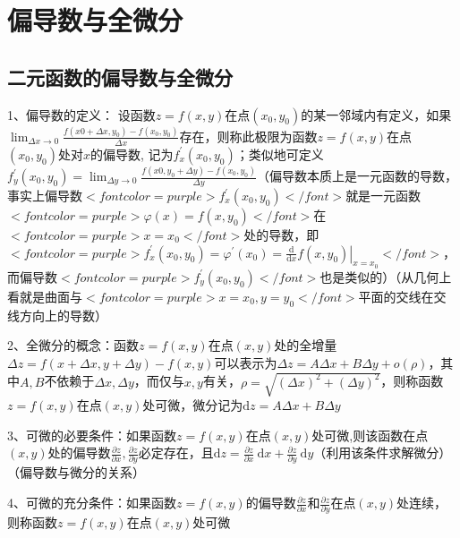 \section{偏导数与全微分}



\subsection{二元函数的偏导数与全微分}

1、偏导数的定义： 设函数$ z=f(x, y) $在点$ \left(x_{0}, y_{0}\right) $的某一邻域内有定义，如果$ \lim_{\Delta x \rightarrow 0} \frac{f\left(x{0}+\Delta x, y_{0}\right)-f\left(x_{0}, y_{0}\right)}{\Delta x} $存在，则称此极限为函数$ z=f(x, y) $在点$ \left(x_{0}, y_{0}\right) $处对$ x $的偏导数, 记为$ f_{x}^{\prime}\left(x_{0}, y_{0}\right) $；类似地可定义$ f_{y}^{\prime}\left(x_{0}, y_{0}\right)=\lim_{\Delta y \rightarrow 0} \frac{f\left(x{0}, y_{0}+\Delta y\right)-f\left(x_{0}, y_{0}\right)}{\Delta y} $（偏导数本质上是一元函数的导数，事实上偏导数$ <font color=purple>f_{x}^{\prime}\left(x_{0}, y_{0}\right)</font> $就是一元函数$ <font color=purple>\varphi(x)=f\left(x, y_{0}\right)</font> $在$ <font color=purple>x=x_{0}</font> $处的导数，即$ <font color=purple>f_{x}^{\prime}\left(x_{0}, y_{0}\right)=\varphi^{\prime}\left(x_{0}\right)=\left.\frac{\mathrm{d}}{\mathrm{d} x} f\left(x, y_{0}\right)\right|_{x=x_{0}}</font> $，而偏导数$ <font color=purple>f_{y}^{\prime}\left(x_{0}, y_{0}\right)</font> $也是类似的）（从几何上看就是曲面与$ <font color=purple>x=x_0,y=y_0</font> $平面的交线在交线方向上的导数）

2、全微分的概念：函数$ z=f(x, y) $在点$ (x, y) $处的全增量$ \Delta z=f(x+\Delta x, y+\Delta y)-f(x, y) $可以表示为$ \Delta z=A \Delta x+B \Delta y+o(\rho) $，其中$ A,B $不依赖于$ \Delta x, \Delta y $，而仅与$ x, y $有关，$ \rho=\sqrt{(\Delta x)^{2}+(\Delta y)^{2}} $，则称函数$ z=f(x, y) $在点$ (x, y) $处可微，微分记为$ \mathrm{d} z=A \Delta x+B \Delta y $

3、可微的必要条件：如果函数$ z=f(x, y) $在点$ (x, y) $处可微,则该函数在点$ (x, y) $处的偏导数$ \frac{\partial z}{\partial x}, \frac{\partial z}{\partial y} $必定存在，且$ \mathrm{d} z=\frac{\partial z}{\partial x} \mathrm{~d} x+\frac{\partial z}{\partial y} \mathrm{~d} y $（利用该条件求解微分）（偏导数与微分的关系）

4、可微的充分条件：如果函数$ z=f(x, y) $的偏导数$ \frac{\partial z}{\partial x} $和$ \frac{\partial z}{\partial y} $在点$ (x, y) $处连续，则称函数$ z=f(x, y) $在点$ (x, y) $处可微


